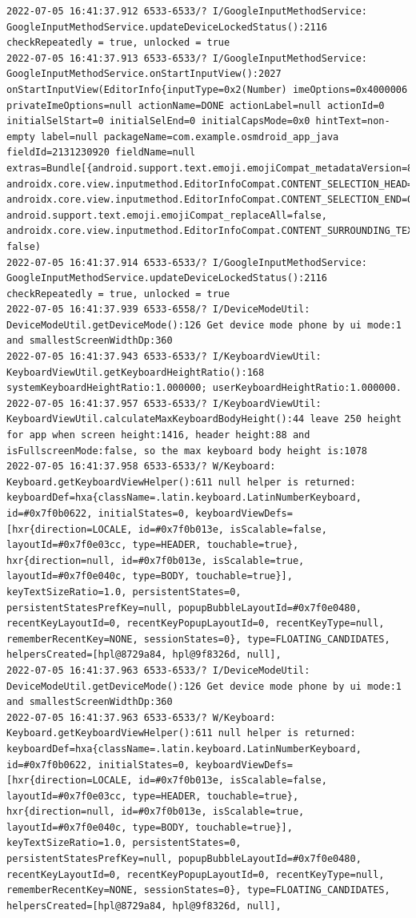 \documentclass[a4paper,12pt]{book}
\begin{document}
\begin{lstlisting}
2022-07-05 16:41:37.912 6533-6533/? I/GoogleInputMethodService: GoogleInputMethodService.updateDeviceLockedStatus():2116 checkRepeatedly = true, unlocked = true
2022-07-05 16:41:37.913 6533-6533/? I/GoogleInputMethodService: GoogleInputMethodService.onStartInputView():2027 onStartInputView(EditorInfo{inputType=0x2(Number) imeOptions=0x4000006 privateImeOptions=null actionName=DONE actionLabel=null actionId=0 initialSelStart=0 initialSelEnd=0 initialCapsMode=0x0 hintText=non-empty label=null packageName=com.example.osmdroid_app_java fieldId=2131230920 fieldName=null extras=Bundle[{android.support.text.emoji.emojiCompat_metadataVersion=8, androidx.core.view.inputmethod.EditorInfoCompat.CONTENT_SELECTION_HEAD=0, androidx.core.view.inputmethod.EditorInfoCompat.CONTENT_SELECTION_END=0, android.support.text.emoji.emojiCompat_replaceAll=false, androidx.core.view.inputmethod.EditorInfoCompat.CONTENT_SURROUNDING_TEXT=}]}, false)
2022-07-05 16:41:37.914 6533-6533/? I/GoogleInputMethodService: GoogleInputMethodService.updateDeviceLockedStatus():2116 checkRepeatedly = true, unlocked = true
2022-07-05 16:41:37.939 6533-6558/? I/DeviceModeUtil: DeviceModeUtil.getDeviceMode():126 Get device mode phone by ui mode:1 and smallestScreenWidthDp:360
2022-07-05 16:41:37.943 6533-6533/? I/KeyboardViewUtil: KeyboardViewUtil.getKeyboardHeightRatio():168 systemKeyboardHeightRatio:1.000000; userKeyboardHeightRatio:1.000000.
2022-07-05 16:41:37.957 6533-6533/? I/KeyboardViewUtil: KeyboardViewUtil.calculateMaxKeyboardBodyHeight():44 leave 250 height for app when screen height:1416, header height:88 and isFullscreenMode:false, so the max keyboard body height is:1078
2022-07-05 16:41:37.958 6533-6533/? W/Keyboard: Keyboard.getKeyboardViewHelper():611 null helper is returned: keyboardDef=hxa{className=.latin.keyboard.LatinNumberKeyboard, id=#0x7f0b0622, initialStates=0, keyboardViewDefs=[hxr{direction=LOCALE, id=#0x7f0b013e, isScalable=false, layoutId=#0x7f0e03cc, type=HEADER, touchable=true}, hxr{direction=null, id=#0x7f0b013e, isScalable=true, layoutId=#0x7f0e040c, type=BODY, touchable=true}], keyTextSizeRatio=1.0, persistentStates=0, persistentStatesPrefKey=null, popupBubbleLayoutId=#0x7f0e0480, recentKeyLayoutId=0, recentKeyPopupLayoutId=0, recentKeyType=null, rememberRecentKey=NONE, sessionStates=0}, type=FLOATING_CANDIDATES, helpersCreated=[hpl@8729a84, hpl@9f8326d, null], 
2022-07-05 16:41:37.963 6533-6533/? I/DeviceModeUtil: DeviceModeUtil.getDeviceMode():126 Get device mode phone by ui mode:1 and smallestScreenWidthDp:360
2022-07-05 16:41:37.963 6533-6533/? W/Keyboard: Keyboard.getKeyboardViewHelper():611 null helper is returned: keyboardDef=hxa{className=.latin.keyboard.LatinNumberKeyboard, id=#0x7f0b0622, initialStates=0, keyboardViewDefs=[hxr{direction=LOCALE, id=#0x7f0b013e, isScalable=false, layoutId=#0x7f0e03cc, type=HEADER, touchable=true}, hxr{direction=null, id=#0x7f0b013e, isScalable=true, layoutId=#0x7f0e040c, type=BODY, touchable=true}], keyTextSizeRatio=1.0, persistentStates=0, persistentStatesPrefKey=null, popupBubbleLayoutId=#0x7f0e0480, recentKeyLayoutId=0, recentKeyPopupLayoutId=0, recentKeyType=null, rememberRecentKey=NONE, sessionStates=0}, type=FLOATING_CANDIDATES, helpersCreated=[hpl@8729a84, hpl@9f8326d, null], 

\end{lstlisting}
\end{document}

